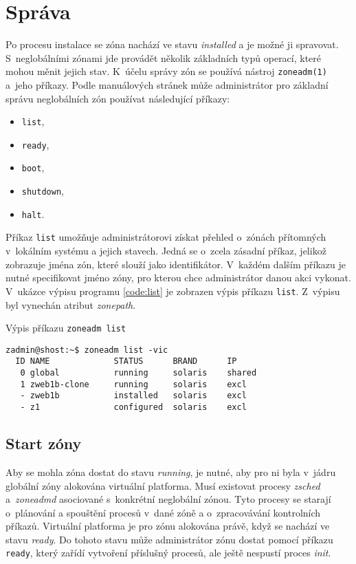 \section{Správa}
\label{chapter:zones:management}
Po procesu instalace se zóna nachází ve stavu \textit{installed} a je možné ji spravovat. S~neglobálními zónami jde provádět
několik základních typů operací, které mohou měnit jejich stav. K~účelu správy zón se používá nástroj \verb|zoneadm(1)|
a~jeho příkazy. Podle manuálových stránek \cite{oracle:manpages:zoneadm} může administrátor pro základní správu neglobálních
zón používat následující příkazy:
\begin{itemize}
 \item \verb|list|,
 \item \verb|ready|,
 \item \verb|boot|,
 \item \verb|shutdown|,
 \item \verb|halt|.
\end{itemize}
Příkaz \verb|list| umožňuje administrátorovi získat přehled o~zónách přítomných v~lokálním systému a jejich stavech. Jedná
se o~zcela zásadní příkaz, jelikož zobrazuje jména zón, které slouží jako identifikátor. V~každém dalším příkazu je nutné 
specifikovat jméno zóny, pro kterou chce administrátor danou akci vykonat. V~ukázce výpisu programu \ref{code:list} je zobrazen
výpis příkazu \verb|list|. Z~výpisu byl vynechán atribut \textit{zonepath}.
\begin{listing}[ht]
  \caption{Výpis příkazu \texttt{zoneadm list}}
  \label{code:list}
  \begin{verbatim}
zadmin@shost:~$ zoneadm list -vic
  ID NAME             STATUS      BRAND      IP    
   0 global           running     solaris    shared
   1 zweb1b-clone     running     solaris    excl     
   - zweb1b           installed   solaris    excl  
   - z1               configured  solaris    excl     
  \end{verbatim}
\end{listing}
\subsection{Start zóny}
\label{chapter:zones:management:start}
Aby se mohla zóna dostat do stavu \textit{running}, je nutné, aby pro ni byla v~jádru globální zóny alokována virtuální platforma.
Musí existovat procesy \textit{zsched} a~\textit{zoneadmd} asociované s~konkrétní neglobální zónou. Tyto procesy
se starají o~plánování a spouštění procesů v~dané zóně a o~zpracovávání kontrolních příkazů. Virtuální platforma je pro zónu
alokována právě, když se nachází ve stavu \textit{ready}. Do tohoto stavu může administrátor zónu dostat pomocí příkazu 
\verb|ready|, který zařídí vytvoření příslušný procesů, ale ještě nespustí proces \textit{init}.

